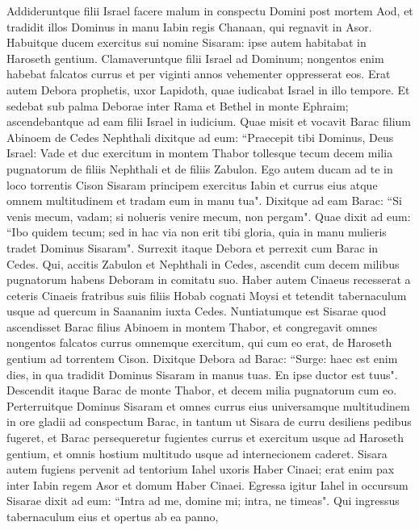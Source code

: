 \begin{biblechapter}  
\verse Addideruntque filii Israel facere malum in conspectu Domini post mortem Aod, 
\verse et tradidit illos Dominus in manu Iabin regis Chanaan, qui regnavit in Asor. Habuitque ducem exercitus sui nomine Sisaram: ipse autem habitabat in Haroseth gentium. 
\verse Clamaveruntque filii Israel ad Dominum; nongentos enim habebat falcatos currus et per viginti annos vehementer oppresserat eos. 
\verse Erat autem Debora prophetis, uxor Lapidoth, quae iudicabat Israel in illo tempore. 
\verse Et sedebat sub palma Deborae inter Rama et Bethel in monte Ephraim; ascendebantque ad eam filii Israel in iudicium. 
\verse Quae misit et vocavit Barac filium Abinoem de Cedes Nephthali dixitque ad eum: “Praecepit tibi Dominus, Deus Israel: Vade et duc exercitum in montem Thabor tollesque tecum decem milia pugnatorum de filiis Nephthali et de filiis Zabulon. 
\verse Ego autem ducam ad te in loco torrentis Cison Sisaram principem exercitus Iabin et currus eius atque omnem multitudinem et tradam eum in manu tua". 
\verse Dixitque ad eam Barac: “Si venis mecum, vadam; si nolueris venire mecum, non pergam".  
\verse Quae dixit ad eum: “Ibo quidem tecum; sed in hac via non erit tibi gloria, quia in manu mulieris tradet Dominus Sisaram". Surrexit itaque Debora et perrexit cum Barac in Cedes. 
\verse Qui, accitis Zabulon et Nephthali in Cedes, ascendit cum decem milibus pugnatorum habens Deboram in comitatu suo. 
\verse Haber autem Cinaeus recesserat a ceteris Cinaeis fratribus suis filiis Hobab cognati Moysi et tetendit tabernaculum usque ad quercum in Saananim iuxta Cedes. 
\verse Nuntiatumque est Sisarae quod ascendisset Barac filius Abinoem in montem Thabor, 
\verse et congregavit omnes nongentos falcatos currus omnemque exercitum, qui cum eo erat, de Haroseth gentium ad torrentem Cison. 
\verse Dixitque Debora ad Barac: “Surge: haec est enim dies, in qua tradidit Dominus Sisaram in manus tuas. En ipse ductor est tuus". Descendit itaque Barac de monte Thabor, et decem milia pugnatorum cum eo. 
\verse Perterruitque Dominus Sisaram et omnes currus eius universamque multitudinem in ore gladii ad conspectum Barac, in tantum ut Sisara de curru desiliens pedibus fugeret, 
\verse et Barac persequeretur fugientes currus et exercitum usque ad Haroseth gentium, et omnis hostium multitudo usque ad internecionem caderet. 
\verse Sisara autem fugiens pervenit ad tentorium Iahel uxoris Haber Cinaei; erat enim pax inter Iabin regem Asor et domum Haber Cinaei. 
\verse Egressa igitur Iahel in occursum Sisarae dixit ad eum: “Intra ad me, domine mi; intra, ne timeas". Qui ingressus tabernaculum eius et opertus ab ea panno, 

\end{biblechapter}
